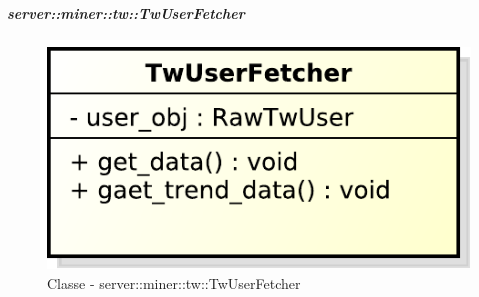 	\subparagraph{server::miner::tw::TwUserFetcher} %
		\label{subp:server_miner_tw_TwUserFetcher}
		    \begin{figure}[!htbp]
 		 		\centering
 				\centerline{\includegraphics[scale=0.75]{./images/server/classes/miner/tw_user_fetcher.pdf}}
 				\caption{Classe - server::miner::tw::TwUserFetcher}
			\end{figure}
